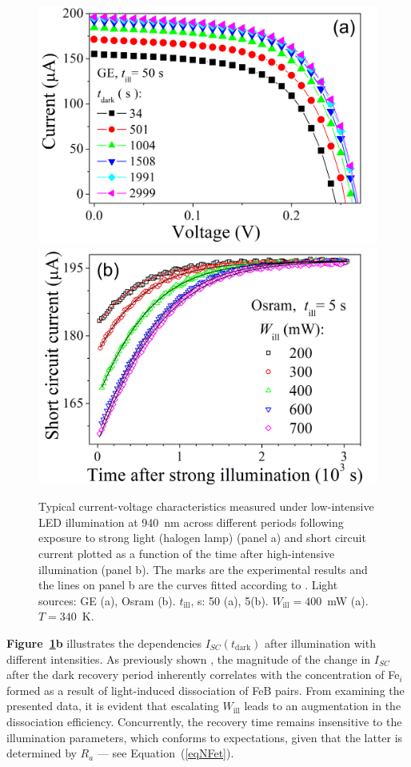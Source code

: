 \documentclass{WileyMSP-template}
\begin{document}
\begin{figure}
\centering
  \includegraphics[width=0.4\linewidth]{Fig2a.png}
  \includegraphics[width=0.4\linewidth]{Fig2b.png}
  \caption{Typical current-voltage characteristics measured
  under low-intensive LED illumination at 940~nm across different periods following exposure to strong light (halogen lamp) (panel a) and
  short circuit current plotted as a function of the time after high-intensive illumination (panel b).
  The marks are the experimental results and the lines on panel b are the curves fitted according to \cite{Olikh2022:JMatSci,Olikh2021JAP}.
  Light sources: GE (a), Osram (b).
  $t_\mathrm{ill}$, s: 50 (a), 5(b).
  $W_\mathrm{ill}=400$~mW (a).
  $T=340$~K.}
  \label{fig2}
\end{figure}

\textbf{Figure~\ref{fig2}b} illustrates the dependencies $I_{SC}(t_\mathrm{dark})$ after illumination with different intensities.
As previously shown \cite{Olikh2021JAP}, the magnitude of the change in $I_{SC}$ after the dark recovery period
inherently correlates with the concentration of Fe$_i$ formed as a result of light-induced dissociation of FeB pairs.
From examining the presented data, it is evident that escalating $W_\mathrm{ill}$ leads to an augmentation in the dissociation efficiency.
Concurrently, the recovery time remains insensitive to the illumination parameters, which conforms to expectations,
given that the latter is determined by $R_a$ --- see Equation~(\ref{eqNFet}).
\end{document}
